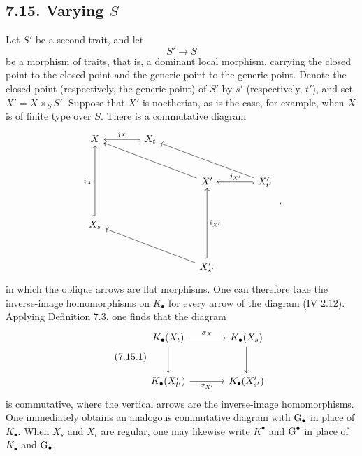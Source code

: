 \subsection*{7.15. Varying $S$}
Let $S'$ be a second trait, and let
\[
S'\longrightarrow S
\]
be a morphism of traits, that is, a dominant local morphism, carrying the
closed point to the closed point and the generic point to the generic point.
Denote the closed point (respectively, the generic point) of $S'$ by $s'$
(respectively, $t'$), and set $X'=X\times_SS'$. Suppose that $X'$ is
noetherian, as is the case, for example, when $X$ is of finite type over $S$.
There is a commutative diagram
\[
\begin{tikzcd}[column sep=large,row sep=large]
X & X_t \arrow[l,hook,"j_X"'] & & \\
& & X' \arrow[ull] & X'_{t'} \arrow[l,hook,"j_{X'}"'] \arrow[ull] \\
X_s \arrow[uu,hook,"i_X"] & & & \\
& & X'_{s'} \arrow[uu,hook,"i_{X'}"'] \arrow[ull] &
\end{tikzcd}
\;,
\]
in which the oblique arrows are flat morphisms. One can therefore take the
inverse-image homomorphisms on $K_\bullet$ for every arrow of the diagram
(IV 2.12). Applying Definition 7.3, one finds that the diagram
\begin{equation}\tag{7.15.1}
\begin{tikzcd}[column sep=large,row sep=large]
K_\bullet(X_t) \arrow[r,"\sigma_X"] \arrow[d] &
K_\bullet(X_s) \arrow[d]\\
K_\bullet(X'_{t'}) \arrow[r,"\sigma_{X'}"'] &
K_\bullet(X'_{s'})
\end{tikzcd}
\end{equation}
is commutative, where the vertical arrows are the inverse-image
homomorphisms. One immediately obtains an analogous commutative diagram with
$\operatorname{G}_\bullet$ in place of $K_\bullet$. When $X_s$ and $X_t$ are regular, one
may likewise write $K^\bullet$ and $\operatorname{G}^\bullet$ in place of $K_\bullet$ and
$\operatorname{G}_\bullet$.












